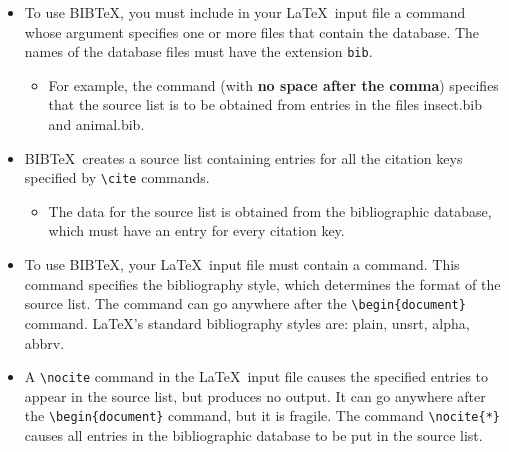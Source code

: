 \documentclass{article}
\begin{document}
\begin{itemize}
   
   \item To use BIB\TeX, you must include in your \LaTeX\ input file a \verb:: command
    whose argument specifies one or more files that contain the database. The names of the database
    files must have the extension \texttt{bib}.
    
   \begin{itemize}
      \item For example, the command \verb:: (with \textbf{no space
       after the comma}) specifies that the source list is to be obtained from entries in the files
       insect.bib and animal.bib.
   \end{itemize}
   
   \item BIB\TeX\ creates a source list containing entries for all the citation keys specified
    by \verb:\cite: commands. 
   
   \begin{itemize}
      \item The data for the source list is obtained from the bibliographic database, which must
       have an entry for every citation key.
   \end{itemize}
    
   \item To use BIB\TeX, your \LaTeX\ input file must contain a \verb:: command.
    This command specifies the bibliography style, which determines the format of the source list. 
    The \verb:: command can go anywhere after the \verb:\begin{document}: command. 
    \LaTeX's standard bibliography styles are: plain, unsrt, alpha, abbrv.
   
   \item A \verb:\nocite: command in the \LaTeX\ input file causes the specified entries to appear
    in the source list, but produces no output. 
    It can go anywhere after the \verb:\begin{document}: command, but it is fragile.
    The command \verb:\nocite{*}: causes all entries in the bibliographic database to be put in the
    source list.
\end{itemize}

\end{document}
